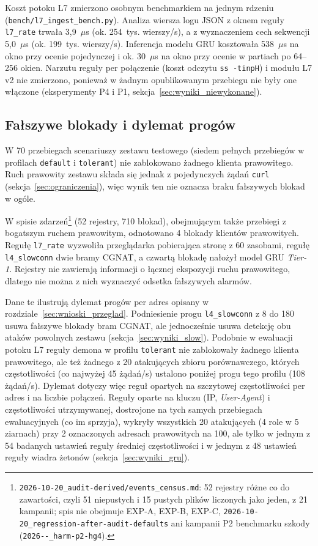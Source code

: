 \documentclass[a4paper,12pt]{article}
\begin{document}
Koszt potoku L7 zmierzono osobnym benchmarkiem na jednym rdzeniu (\texttt{bench/\allowbreak l7\_ingest\_\allowbreak bench.py}). Analiza wiersza logu JSON z oknem reguły \texttt{l7\_rate} trwała 3,9~$\mu$s (ok. 254~tys. wierszy/s), a z wyznaczeniem cech sekwencji 5,0~$\mu$s (ok. 199~tys. wierszy/s). Inferencja modelu GRU kosztowała 538~$\mu$s na okno przy ocenie pojedynczej i ok. 30~$\mu$s na okno przy ocenie w partiach po 64--256 okien. Narzutu reguły per połączenie (koszt odczytu \texttt{ss -tinpH}) i modułu L7 v2 nie zmierzono, ponieważ w żadnym opublikowanym przebiegu nie były one włączone (eksperymenty P4 i P1, sekcja~\ref{sec:wyniki_niewykonane}).

\subsection{Fałszywe blokady i dylemat progów}\label{sec:wyniki_fp}
W 70 przebiegach scenariuszy zestawu testowego (siedem pełnych przebiegów w profilach \texttt{default} i \texttt{tolerant}) nie zablokowano żadnego klienta prawowitego. Ruch prawowity zestawu składa się jednak z pojedynczych żądań \texttt{curl} (sekcja~\ref{sec:ograniczenia}), więc wynik ten nie oznacza braku fałszywych blokad w ogóle.

W spisie zdarzeń\footnote{\raggedright \texttt{2026-10-20\_audit-derived/events\_census.md}: 52 rejestry różne co do zawartości, czyli 51 niepustych i 15 pustych plików liczonych jako jeden, z 21 kampanii; spis nie obejmuje EXP-A, EXP-B, EXP-C, \texttt{2026-10-20\_regression-after-audit-defaults} ani kampanii P2 benchmarku szkody (\texttt{2026--\_\allowbreak harm-\allowbreak p2-\allowbreak hg4}).} (52 rejestry, 710 blokad), obejmującym także przebiegi z bogatszym ruchem prawowitym, odnotowano 4 blokady klientów prawowitych. Regułę \texttt{l7\_rate} wyzwoliła przeglądarka pobierająca stronę z 60 zasobami, regułę \texttt{l4\_slowconn} dwie bramy CGNAT, a czwartą blokadę nałożył model GRU \textit{Tier-1}. Rejestry nie zawierają informacji o łącznej ekspozycji ruchu prawowitego, dlatego nie można z nich wyznaczyć odsetka fałszywych alarmów.

Dane te ilustrują dylemat progów per adres opisany w rozdziale~\ref{sec:wnioski_przeglad}. Podniesienie progu \texttt{l4\_slowconn} z 8 do 180 usuwa fałszywe blokady bram CGNAT, ale jednocześnie usuwa detekcję obu ataków powolnych zestawu (sekcja~\ref{sec:wyniki_slow}). Podobnie w ewaluacji potoku L7 reguły demona w profilu \texttt{tolerant} nie zablokowały żadnego klienta prawowitego, ale też żadnego z 20 atakujących zbioru porównawczego, których częstotliwości (co najwyżej 45 żądań/s) ustalono poniżej progu tego profilu (108 żądań/s). Dylemat dotyczy więc reguł opartych na szczytowej częstotliwości per adres i na liczbie połączeń. Reguły oparte na kluczu (IP, \textit{User-Agent}) i częstotliwości utrzymywanej, dostrojone na tych samych przebiegach ewaluacyjnych (co im sprzyja), wykryły wszystkich 20 atakujących (4 role w 5 ziarnach) przy 2 oznaczonych adresach prawowitych na 100, ale tylko w jednym z 54 badanych ustawień reguły średniej częstotliwości i w jednym z 48 ustawień reguły wiadra żetonów (sekcja~\ref{sec:wyniki_gru}).
\end{document}
